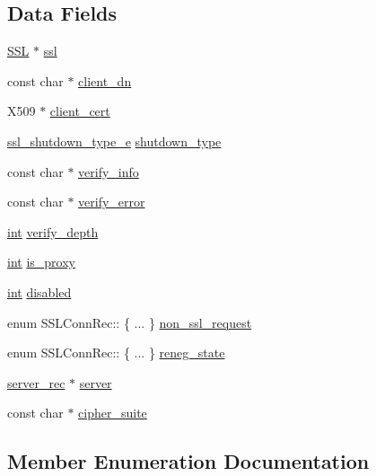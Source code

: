 \subsection*{Data Fields}
\begin{DoxyCompactItemize}
\item 
\hyperlink{group__MOD__SSL_gac05889312301718b3fc106564942ad68}{S\+SL} $\ast$ \hyperlink{structSSLConnRec_acc0257b6ed74d7c6aee8f1a3447df6b5}{ssl}
\item 
const char $\ast$ \hyperlink{structSSLConnRec_a2a646856abf462c90dfbe70e82e52173}{client\+\_\+dn}
\item 
X509 $\ast$ \hyperlink{structSSLConnRec_a99340dc58baeb852d8945f614b813ea2}{client\+\_\+cert}
\item 
\hyperlink{group__MOD__SSL__PRIVATE_gaf8cd4eab3428dc335a1ebbfc8aa18b1b}{ssl\+\_\+shutdown\+\_\+type\+\_\+e} \hyperlink{structSSLConnRec_a5ae9edf7eb331780d8d2903524241e28}{shutdown\+\_\+type}
\item 
const char $\ast$ \hyperlink{structSSLConnRec_a222765269058c8c8fa00113cdaf88b22}{verify\+\_\+info}
\item 
const char $\ast$ \hyperlink{structSSLConnRec_a1d530086ef2e5a96449cda0049edadfe}{verify\+\_\+error}
\item 
\hyperlink{pcre_8txt_a42dfa4ff673c82d8efe7144098fbc198}{int} \hyperlink{structSSLConnRec_a72fc657db836b8eb8d66919de3ff2300}{verify\+\_\+depth}
\item 
\hyperlink{pcre_8txt_a42dfa4ff673c82d8efe7144098fbc198}{int} \hyperlink{structSSLConnRec_a0440848cf22edd01ea3d27a239f4062b}{is\+\_\+proxy}
\item 
\hyperlink{pcre_8txt_a42dfa4ff673c82d8efe7144098fbc198}{int} \hyperlink{structSSLConnRec_a32f5e14a91ee79e6ff430881690bcf96}{disabled}
\item 
enum S\+S\+L\+Conn\+Rec\+:: \{ ... \}  \hyperlink{structSSLConnRec_ad8e5a6eab97a14984224072bdcaeb49b}{non\+\_\+ssl\+\_\+request}
\item 
enum S\+S\+L\+Conn\+Rec\+:: \{ ... \}  \hyperlink{structSSLConnRec_ad36678f508db0c5a628b6a99a76bf3c0}{reneg\+\_\+state}
\item 
\hyperlink{structserver__rec}{server\+\_\+rec} $\ast$ \hyperlink{structSSLConnRec_aae4b90a2b0affa02e0b081f167052bb9}{server}
\item 
const char $\ast$ \hyperlink{structSSLConnRec_ad05c2c70b3f1febdee2a34ca0dbb79fb}{cipher\+\_\+suite}
\end{DoxyCompactItemize}


\subsection{Member Enumeration Documentation}
